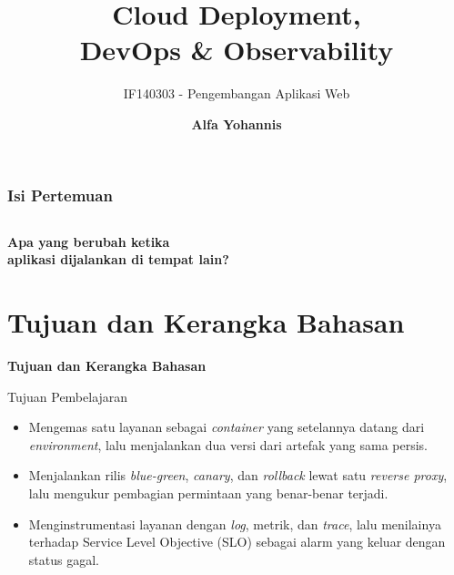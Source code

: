 \documentclass[aspectratio=169, table, 12pt]{beamer}
\title{\Huge Cloud Deployment,\\ \vspace{10pt} DevOps \& Observability}
\subtitle{IF140303 - Pengembangan Aplikasi Web}
\author{\textbf{Alfa Yohannis}}
\begin{document}
\frame{\titlepage}

\begin{frame}[fragile]
  \frametitle{Isi Pertemuan}
  \vspace{14pt}
  \begin{columns}[t]
    {\small\tableofcontents[sections={1-7}]}

    {\small\tableofcontents[sections={8-14}]}
  \end{columns}
\end{frame}

\begin{frame}{\hfill}
  \centering
  \Huge{\textbf{Apa yang berubah ketika\\aplikasi dijalankan di tempat lain?}}
\end{frame}

\section{Tujuan dan Kerangka Bahasan}

\begin{frame}{\hfill}
  \centering
  \Huge{\textbf{Tujuan dan Kerangka Bahasan}}
\end{frame}

\begin{frame}{{\Large Tujuan Pembelajaran}}
  \vspace{10pt}
  \begin{itemize}
    \item Mengemas satu layanan sebagai \textit{container} yang setelannya
          datang dari \textit{environment}, lalu menjalankan dua versi dari
          artefak yang sama persis.
    \item Menjalankan rilis \textit{blue-green}, \textit{canary}, dan
          \textit{rollback} lewat satu \textit{reverse proxy}, lalu mengukur
          pembagian permintaan yang benar-benar terjadi.
    \item Menginstrumentasi layanan dengan \textit{log}, metrik, dan
          \textit{trace}, lalu menilainya terhadap Service Level Objective (SLO) sebagai alarm yang
          keluar dengan status gagal.
  \end{itemize}
\end{frame}
\end{document}
